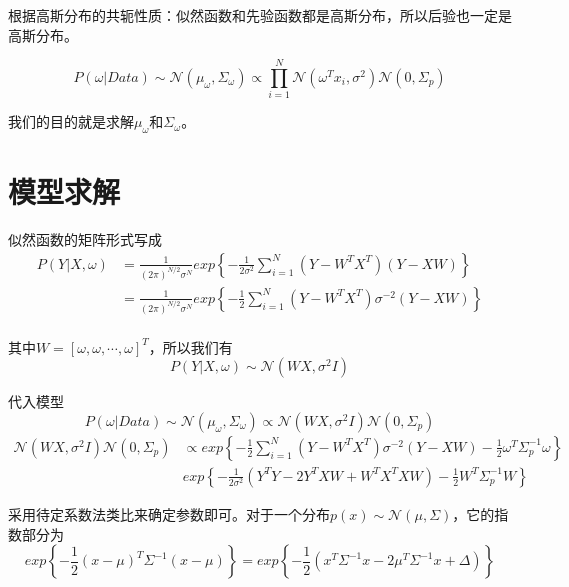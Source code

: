 根据高斯分布的共轭性质：似然函数和先验函数都是高斯分布，所以后验也一定是高斯分布。

\begin{equation}
    P(\omega|Data)\sim \mathcal{N}(\mu_\omega,\varSigma_\omega)\propto \prod_{i=1}^{N} \mathcal{N}(\omega^Tx_i,\sigma^2)\mathcal{N}(0,\varSigma_p)
\end{equation}

我们的目的就是求解$\mu_\omega$和$\varSigma_\omega$。

\section{模型求解}

似然函数的矩阵形式写成
\begin{equation}
    \begin{aligned}
        P(Y|X,\omega)&=\frac{1}{(2\pi)^{N/2}\sigma^N}exp\left\{ -\frac{1}{2\sigma^2}\sum\limits_{i=1}^{N}(Y-W^TX^T)(Y-XW) \right\}\\
        &=\frac{1}{(2\pi)^{N/2}\sigma^N}exp\left\{ -\frac{1}{2}\sum\limits_{i=1}^{N}(Y-W^TX^T)\sigma^{-2}(Y-XW) \right\}\\
    \end{aligned}
\end{equation}

其中$W=[\omega,\omega,\cdots,\omega]^T$，所以我们有
\begin{equation}
    P(Y|X,\omega)\sim \mathcal{N}(WX,\sigma^2I)
\end{equation}

代入模型
\begin{equation}
    P(\omega|Data)\sim \mathcal{N}(\mu_\omega,\varSigma_\omega)\propto \mathcal{N}(WX,\sigma^2I)\mathcal{N}(0,\varSigma_p)
\end{equation}
\begin{equation}
  \begin{aligned}
    \mathcal{N}(WX,\sigma^2I)\mathcal{N}(0,\varSigma_p)&\propto exp\left\{ -\frac{1}{2}\sum\limits_{i=1}^{N}(Y-W^TX^T)\sigma^{-2}(Y-XW)-\frac{1}{2}\omega^T\varSigma^{-1}_p\omega \right\}\\
    & exp\left\{ -\frac{1}{2\sigma^2}(Y^TY-2Y^TXW+W^TX^TXW)-\frac{1}{2}W^T\varSigma^{-1}_p W \right\}
\end{aligned}
\end{equation}

采用待定系数法类比来确定参数即可。对于一个分布$p(x)\sim \mathcal{N}(\mu,\varSigma)$，它的指数部分为
\begin{equation}
    exp\left\{ -\frac{1}{2}(x-\mu)^T\varSigma^{-1}(x-\mu) \right\}= exp\left\{ -\frac{1}{2}(x^T\varSigma^{-1}x-2\mu^T\varSigma^{-1}x+\varDelta ) \right\}
\end{equation}

